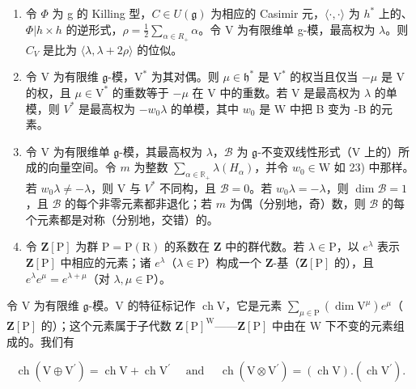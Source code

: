\begin{enumerate}
\def\labelenumi{\arabic{enumi})}
\setcounter{enumi}{21}
\item
  令 \(\varPhi\) 为 g 的 Killing 型，\(C \in U(\mathfrak{g})\) 为相应的 Casimir 元，\(\langle\cdot,\cdot\rangle\) 为 \(h^{*}\) 上的、\(\varPhi|h \times h\) 的逆形式，\(\rho = \frac{1}{2} \sum_{\alpha \in R_{+}} \alpha\)。令 V 为有限维单 g-模，最高权为 \(\lambda\)。则 \(C_{V}\) 是比为 \(\langle\lambda, \lambda + 2\rho\rangle\) 的位似。
\item
  令 \(\mathrm{V}\) 为有限维 \(\mathfrak{g}\)-模，\(\mathrm{V}^*\) 为其对偶。则 \(\mu \in \mathfrak{h}^*\) 是 \(\mathrm{V}^*\) 的权当且仅当 \(-\mu\) 是 \(\mathrm{V}\) 的权，且 \(\mu \in \mathrm{V}^*\) 的重数等于 \(-\mu\) 在 V 中的重数。若 V 是最高权为 \(\lambda\) 的单模，则 \(V^{*}\) 是最高权为 \(-w_{0}\lambda\) 的单模，其中 \(w_{0}\) 是 W 中把 B 变为 -B 的元素。
\item
  令 \(\mathrm{V}\) 为有限维单 \(\mathfrak{g}\)-模，其最高权为 \(\lambda\)，\(\mathcal{B}\) 为 \(\mathfrak{g}\)-不变双线性形式（\(\mathrm{V}\) 上的）所成的向量空间。令 \(m\) 为整数 \(\sum_{\alpha \in \mathbb{R}_+} \lambda(H_\alpha)\)，并令 \(w_0 \in \mathrm{W}\) 如 23) 中那样。若 \(w_0 \lambda \neq -\lambda\)，则 \(\mathrm{V}\) 与 \(V^*\) 不同构，且 \(\mathcal{B} = 0\)。若 \(w_0 \lambda = -\lambda\)，则 \(\dim \mathcal{B} = 1\)，且 \(\mathcal{B}\) 的每个非零元素都非退化；若 \(m\) 为偶（分别地，奇）数，则 \(\mathcal{B}\) 的每个元素都是对称（分别地，交错）的。
\item
  令 \(\mathbf{Z}[\mathrm{P}]\) 为群 \(\mathrm{P} = \mathrm{P}(\mathrm{R})\) 的系数在 \(\mathbf{Z}\) 中的群代数。若 \(\lambda \in \mathrm{P}\)，以 \(e^{\lambda}\) 表示 \(\mathbf{Z}[\mathrm{P}]\) 中相应的元素；诸 \(e^{\lambda}\)（\(\lambda \in \mathrm{P}\)）构成一个 \(\mathbf{Z}\)-基（\(\mathbf{Z}[\mathrm{P}]\) 的），且 \(e^{\lambda}e^{\mu} = e^{\lambda +\mu}\)（对 \(\lambda, \mu \in \mathrm{P}\)）。
\end{enumerate}

令 \(\mathrm{V}\) 为有限维 \(\mathfrak{g}\)-模。\(\mathrm{V}\) 的特征标记作 \(\operatorname{ch} \mathrm{V}\)，它是元素 \(\sum_{\mu \in \mathrm{P}} (\dim \mathrm{V}^{\mu}) e^{\mu}\)（\(\mathbf{Z}[\mathrm{P}]\) 的）；这个元素属于子代数 \(\mathbf{Z}[\mathrm{P}]^{\mathrm{W}}\)——\(\mathbf{Z}[\mathrm{P}]\) 中由在 \(\mathrm{W}\) 下不变的元素组成的。我们有

\[
\operatorname{ch} \left(\mathrm{V} \oplus \mathrm{V} ^ {\prime}\right) = \operatorname{ch} \mathrm{V} + \operatorname{ch} \mathrm{V} ^ {\prime} \quad \text { and } \quad \operatorname{ch} \left(\mathrm{V} \otimes \mathrm{V} ^ {\prime}\right) = (\operatorname{ch} \mathrm{V}). (\operatorname{ch} \mathrm{V} ^ {\prime}).
\]

